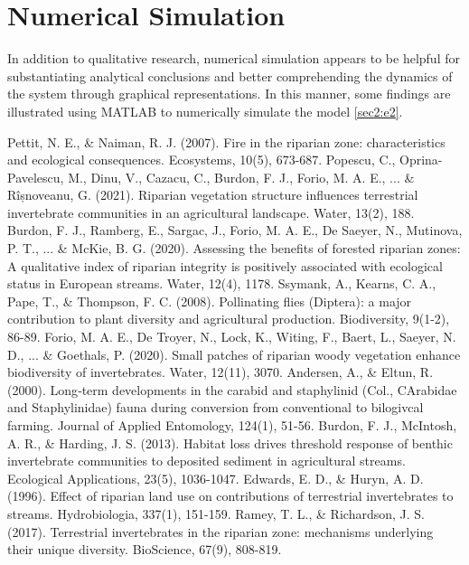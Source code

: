 \documentclass[12pt]{article}
\numberwithin{equation}{section}
\begin{document}
\section{Numerical Simulation}
In addition to qualitative research, numerical simulation appears to be helpful for substantiating analytical conclusions and better comprehending the dynamics of the system through graphical representations. In this manner, some findings are illustrated using MATLAB to numerically simulate the model \eqref{sec2:e2}.
\begin{thebibliography}{99}
  Pettit, N. E., \& Naiman, R. J. (2007). Fire in the riparian zone: characteristics and ecological consequences. Ecosystems, 10(5), 673-687.
  Popescu, C., Oprina-Pavelescu, M., Dinu, V., Cazacu, C., Burdon, F. J., Forio, M. A. E., ... \& Rîșnoveanu, G. (2021). Riparian vegetation structure influences terrestrial invertebrate communities in an agricultural landscape. Water, 13(2), 188.
  Burdon, F. J., Ramberg, E., Sargac, J., Forio, M. A. E., De Saeyer, N., Mutinova, P. T., ... \& McKie, B. G. (2020). Assessing the benefits of forested riparian zones: A qualitative index of riparian integrity is positively associated with ecological status in European streams. Water, 12(4), 1178.
  Ssymank, A., Kearns, C. A., Pape, T., \& Thompson, F. C. (2008). Pollinating flies (Diptera): a major contribution to plant diversity and agricultural production. Biodiversity, 9(1-2), 86-89.
  Forio, M. A. E., De Troyer, N., Lock, K., Witing, F., Baert, L., Saeyer, N. D., ... \& Goethals, P. (2020). Small patches of riparian woody vegetation enhance biodiversity of invertebrates. Water, 12(11), 3070.
  Andersen, A., \& Eltun, R. (2000). Long‐term developments in the carabid and staphylinid (Col., CArabidae and Staphylinidae) fauna during conversion from conventional to bilogivcal farming. Journal of Applied Entomology, 124(1), 51-56.
  Burdon, F. J., McIntosh, A. R., \& Harding, J. S. (2013). Habitat loss drives threshold response of benthic invertebrate communities to deposited sediment in agricultural streams. Ecological Applications, 23(5), 1036-1047.
  Edwards, E. D., \& Huryn, A. D. (1996). Effect of riparian land use on contributions of terrestrial invertebrates to streams. Hydrobiologia, 337(1), 151-159.
  Ramey, T. L., \& Richardson, J. S. (2017). Terrestrial invertebrates in the riparian zone: mechanisms underlying their unique diversity. BioScience, 67(9), 808-819.

\end{thebibliography}
\end{document}
